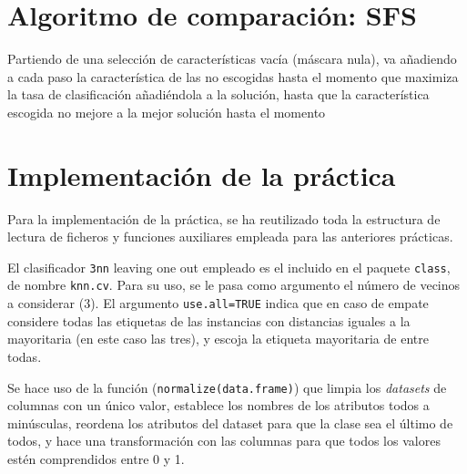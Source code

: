 \documentclass[a4paper,11pt]{article}
\begin{document}
  
\section{Algoritmo de comparación: SFS}
\small{\texttt{}}

Partiendo de una selección de características vacía (máscara nula), va añadiendo a cada paso la característica
de las no escogidas hasta el momento que maximiza la tasa de clasificación añadiéndola a la solución, hasta
que la característica escogida no mejore a la mejor solución hasta el momento

\section{Implementación de la práctica}
Para la implementación de la práctica, se ha reutilizado toda la estructura de lectura de ficheros y funciones auxiliares
empleada para las anteriores prácticas.

El clasificador \texttt{3nn} leaving one out empleado es el incluido en el paquete \texttt{class}, de nombre
\texttt{knn.cv}. Para su uso, se le pasa como argumento el número de vecinos a considerar (3). El argumento 
\texttt{use.all=TRUE} indica que en caso de empate considere todas las etiquetas de las instancias con distancias 
iguales a la mayoritaria (en este caso las tres), y escoja la etiqueta mayoritaria de entre todas. 

Se hace uso de la función (\texttt{normalize(data.frame)}) que limpia los \textit{datasets} de columnas con
un único valor, establece los nombres de los atributos todos a minúsculas, reordena los atributos del dataset para que
la clase sea el último de todos, y hace una transformación con las columnas para que todos los valores estén comprendidos
entre 0 y 1.
\end{document}
